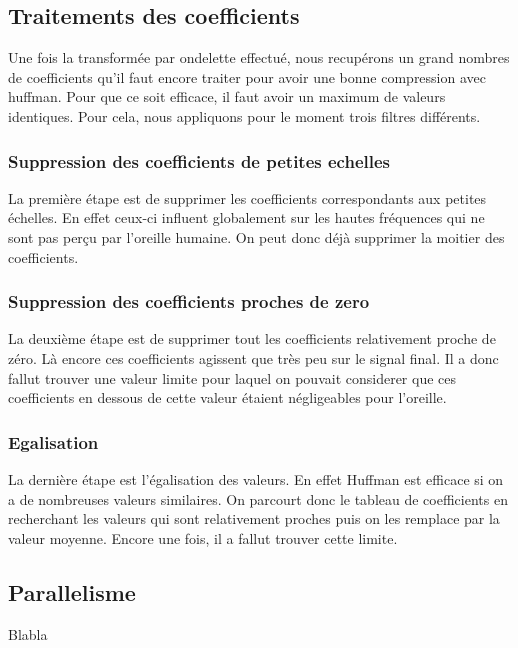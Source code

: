 \documentclass[a4paper,12pt]{article}
\begin{document}
\subsection{Traitements des coefficients}
Une fois la transformée par ondelette effectué, nous recupérons un
grand nombres de coefficients qu'il faut encore traiter pour avoir une
bonne compression avec huffman. Pour que ce soit efficace, il faut
avoir un maximum de valeurs identiques. Pour cela, nous appliquons
pour le moment trois filtres différents.
\subsubsection{Suppression des coefficients de petites echelles}
La première étape est de supprimer les coefficients correspondants aux
petites échelles. En effet ceux-ci influent globalement sur les hautes
fréquences qui ne sont pas perçu par l'oreille humaine. On peut donc
déjà supprimer la moitier des coefficients.
\subsubsection{Suppression des coefficients proches de zero}
La deuxième étape est de supprimer tout les coefficients relativement
proche de zéro. Là encore ces coefficients agissent que très peu sur
le signal final. Il a donc fallut trouver une valeur limite pour
laquel on pouvait considerer que ces coefficients en dessous de cette
valeur étaient négligeables pour l'oreille.
\subsubsection{Egalisation}
La dernière étape est l'égalisation des valeurs. En effet Huffman est
efficace si on a de nombreuses valeurs similaires. On parcourt donc le
tableau de coefficients en recherchant les valeurs qui sont
relativement proches puis on les remplace par la valeur
moyenne. Encore une fois, il a fallut trouver cette limite.
	\subsection{Parallelisme}
Blabla
\end{document}
